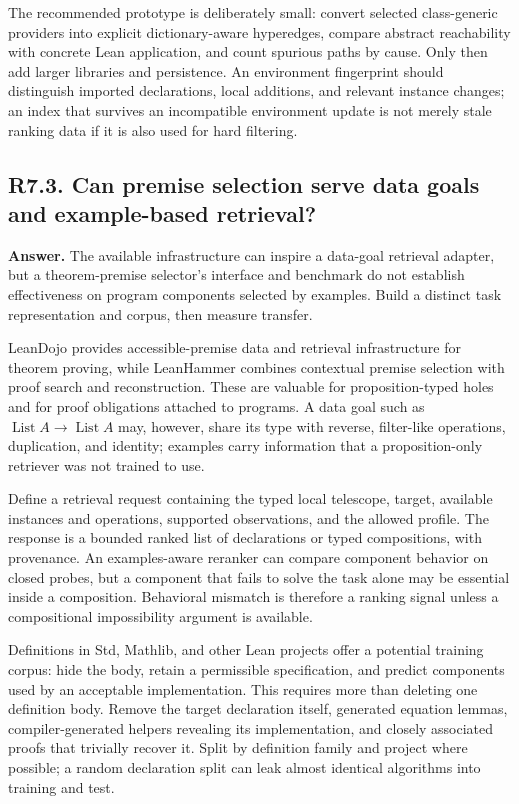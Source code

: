 \documentclass[11pt,a4paper]{article}
\newcommand{\question}[2]{\subsection{#1. #2}\label{q:#1}}
\newcommand{\List}{\operatorname{List}}
\theoremstyle{definition}
\theoremstyle{remark}
\begin{document}
The recommended prototype is deliberately small: convert selected class-generic providers into explicit dictionary-aware hyperedges, compare abstract reachability with concrete Lean application, and count spurious paths by cause. Only then add larger libraries and persistence. An environment fingerprint should distinguish imported declarations, local additions, and relevant instance changes; an index that survives an incompatible environment update is not merely stale ranking data if it is also used for hard filtering.

\question{R7.3}{Can premise selection serve data goals and example-based retrieval?}

\textbf{Answer.} The available infrastructure can inspire a data-goal retrieval adapter, but a theorem-premise selector's interface and benchmark do not establish effectiveness on program components selected by examples. Build a distinct task representation and corpus, then measure transfer.

LeanDojo provides accessible-premise data and retrieval infrastructure for theorem proving, while LeanHammer combines contextual premise selection with proof search and reconstruction.\cite{leandojo,leanhammer} These are valuable for proposition-typed holes and for proof obligations attached to programs. A data goal such as $\List A\to\List A$ may, however, share its type with reverse, filter-like operations, duplication, and identity; examples carry information that a proposition-only retriever was not trained to use.

Define a retrieval request containing the typed local telescope, target, available instances and operations, supported observations, and the allowed profile. The response is a bounded ranked list of declarations or typed compositions, with provenance. An examples-aware reranker can compare component behavior on closed probes, but a component that fails to solve the task alone may be essential inside a composition. Behavioral mismatch is therefore a ranking signal unless a compositional impossibility argument is available.

Definitions in Std, Mathlib, and other Lean projects offer a potential training corpus: hide the body, retain a permissible specification, and predict components used by an acceptable implementation. This requires more than deleting one definition body. Remove the target declaration itself, generated equation lemmas, compiler-generated helpers revealing its implementation, and closely associated proofs that trivially recover it. Split by definition family and project where possible; a random declaration split can leak almost identical algorithms into training and test.
\end{document}
